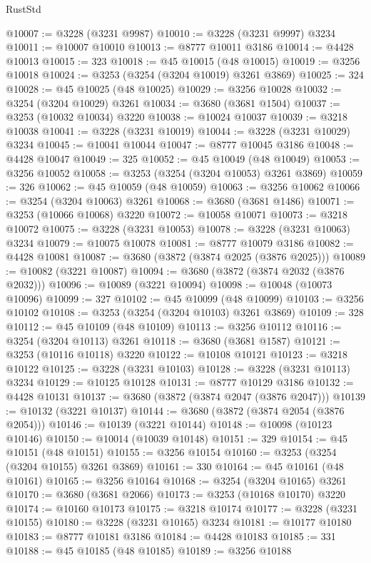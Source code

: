 \begin{lexlean}{RustStd}
\begin{coremodule}
@10007 := @3228 (@3231 @9987)
@10010 := @3228 (@3231 @9997) @3234
@10011 := @10007 @10010
@10013 := @8777 @10011 @3186
@10014 := @4428 @10013
@10015 := 323
@10018 := @45 @10015 (@48 @10015)
@10019 := @3256 @10018
@10024 := @3253 (@3254 (@3204 @10019) @3261 @3869)
@10025 := 324
@10028 := @45 @10025 (@48 @10025)
@10029 := @3256 @10028
@10032 := @3254 (@3204 @10029) @3261
@10034 := @3680 (@3681 @1504)
@10037 := @3253 (@10032 @10034) @3220
@10038 := @10024 @10037
@10039 := @3218 @10038
@10041 := @3228 (@3231 @10019)
@10044 := @3228 (@3231 @10029) @3234
@10045 := @10041 @10044
@10047 := @8777 @10045 @3186
@10048 := @4428 @10047
@10049 := 325
@10052 := @45 @10049 (@48 @10049)
@10053 := @3256 @10052
@10058 := @3253 (@3254 (@3204 @10053) @3261 @3869)
@10059 := 326
@10062 := @45 @10059 (@48 @10059)
@10063 := @3256 @10062
@10066 := @3254 (@3204 @10063) @3261
@10068 := @3680 (@3681 @1486)
@10071 := @3253 (@10066 @10068) @3220
@10072 := @10058 @10071
@10073 := @3218 @10072
@10075 := @3228 (@3231 @10053)
@10078 := @3228 (@3231 @10063) @3234
@10079 := @10075 @10078
@10081 := @8777 @10079 @3186
@10082 := @4428 @10081
@10087 := @3680 (@3872 (@3874 @2025 (@3876 @2025)))
@10089 := @10082 (@3221 @10087)
@10094 := @3680 (@3872 (@3874 @2032 (@3876 @2032)))
@10096 := @10089 (@3221 @10094)
@10098 := @10048 (@10073 @10096)
@10099 := 327
@10102 := @45 @10099 (@48 @10099)
@10103 := @3256 @10102
@10108 := @3253 (@3254 (@3204 @10103) @3261 @3869)
@10109 := 328
@10112 := @45 @10109 (@48 @10109)
@10113 := @3256 @10112
@10116 := @3254 (@3204 @10113) @3261
@10118 := @3680 (@3681 @1587)
@10121 := @3253 (@10116 @10118) @3220
@10122 := @10108 @10121
@10123 := @3218 @10122
@10125 := @3228 (@3231 @10103)
@10128 := @3228 (@3231 @10113) @3234
@10129 := @10125 @10128
@10131 := @8777 @10129 @3186
@10132 := @4428 @10131
@10137 := @3680 (@3872 (@3874 @2047 (@3876 @2047)))
@10139 := @10132 (@3221 @10137)
@10144 := @3680 (@3872 (@3874 @2054 (@3876 @2054)))
@10146 := @10139 (@3221 @10144)
@10148 := @10098 (@10123 @10146)
@10150 := @10014 (@10039 @10148)
@10151 := 329
@10154 := @45 @10151 (@48 @10151)
@10155 := @3256 @10154
@10160 := @3253 (@3254 (@3204 @10155) @3261 @3869)
@10161 := 330
@10164 := @45 @10161 (@48 @10161)
@10165 := @3256 @10164
@10168 := @3254 (@3204 @10165) @3261
@10170 := @3680 (@3681 @2066)
@10173 := @3253 (@10168 @10170) @3220
@10174 := @10160 @10173
@10175 := @3218 @10174
@10177 := @3228 (@3231 @10155)
@10180 := @3228 (@3231 @10165) @3234
@10181 := @10177 @10180
@10183 := @8777 @10181 @3186
@10184 := @4428 @10183
@10185 := 331
@10188 := @45 @10185 (@48 @10185)
@10189 := @3256 @10188

\end{coremodule}
\end{lexlean}
